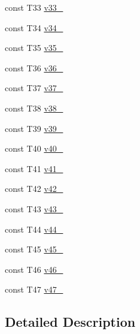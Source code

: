 \begin{DoxyCompactItemize}
\item 
const \-T33 \hyperlink{classtesting_1_1internal_1_1ValueArray47_a7a6cefe370b709c3a7b35b6d5ca8c778}{v33\-\_\-}
\item 
const \-T34 \hyperlink{classtesting_1_1internal_1_1ValueArray47_ab379e4d515d66bc57e05267515fab1d9}{v34\-\_\-}
\item 
const \-T35 \hyperlink{classtesting_1_1internal_1_1ValueArray47_a0a36112ac9b7a13572874977627ed192}{v35\-\_\-}
\item 
const \-T36 \hyperlink{classtesting_1_1internal_1_1ValueArray47_a531a52e3e8de6e982edd23c2547e4c49}{v36\-\_\-}
\item 
const \-T37 \hyperlink{classtesting_1_1internal_1_1ValueArray47_a2c4a91368c3edf933948acb4996a833d}{v37\-\_\-}
\item 
const \-T38 \hyperlink{classtesting_1_1internal_1_1ValueArray47_a364bf323d933a4adac3a9b46952ae1d3}{v38\-\_\-}
\item 
const \-T39 \hyperlink{classtesting_1_1internal_1_1ValueArray47_a0bd84ae118aa56fd251e494d1abc19fb}{v39\-\_\-}
\item 
const \-T40 \hyperlink{classtesting_1_1internal_1_1ValueArray47_ac99de9e6d59182db6141430e54f51e9c}{v40\-\_\-}
\item 
const \-T41 \hyperlink{classtesting_1_1internal_1_1ValueArray47_ad6f7550d60e8d13ade4c5033d07312e9}{v41\-\_\-}
\item 
const \-T42 \hyperlink{classtesting_1_1internal_1_1ValueArray47_a537a167baefbb86e0b3991dfd3d9437a}{v42\-\_\-}
\item 
const \-T43 \hyperlink{classtesting_1_1internal_1_1ValueArray47_a06f403913e68fabe63f09851fbdf196a}{v43\-\_\-}
\item 
const \-T44 \hyperlink{classtesting_1_1internal_1_1ValueArray47_a7fcd42ff659307eb27dce3d92c0dfd27}{v44\-\_\-}
\item 
const \-T45 \hyperlink{classtesting_1_1internal_1_1ValueArray47_afd7b4cf77fb709e9ebc572533d6ec67a}{v45\-\_\-}
\item 
const \-T46 \hyperlink{classtesting_1_1internal_1_1ValueArray47_a268a5df16444ff6ecee84ee2cf8ba5cf}{v46\-\_\-}
\item 
const \-T47 \hyperlink{classtesting_1_1internal_1_1ValueArray47_afcdfdbd5fa48a3dc7175a1e75f795257}{v47\-\_\-}
\end{DoxyCompactItemize}


\subsection{\-Detailed \-Description}
